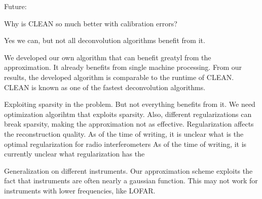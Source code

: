 Future:








Why is CLEAN so much better with calibration errors?


Yes we can, but not all deconvolution algorithms benefit from it.

We developed our own algorithm that can benefit greatyl from the approximation. It already benefits from single machine processing. From our results, the developed algorithm is comparable to the runtime of CLEAN. CLEAN is known as one of the fastest deconvolution algorithms.

Exploiting sparsity in the problem. But not everything benefits from it. We need optimization algorihtm that exploits sparsity. Also, different regularizations can break sparsity, making the approximation not as effective.
Regularization affects the reconstruction quality. As of the time of writing, it is unclear what is the optimal regularization for radio interferometers
As of the time of writing, it is currently unclear what regularization has the



Generalization on different instruments. Our approximation scheme exploits the fact that instruments are often nearly a gaussian function. This may not work for instruments with lower frequencies, like LOFAR. 
 
